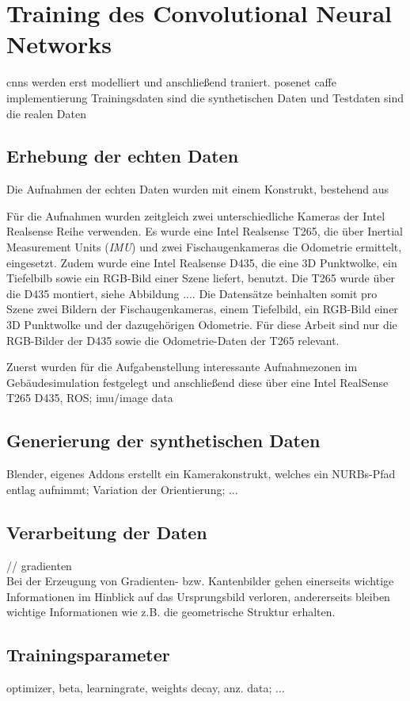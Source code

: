 
\section{Training des Convolutional Neural Networks}
cnns werden erst modelliert und anschließend traniert.
posenet caffe implementierung
Trainingsdaten sind die synthetischen Daten und Testdaten sind die realen Daten

\subsection{Erhebung der echten Daten}

Die Aufnahmen der echten Daten wurden mit einem Konstrukt, bestehend aus 

Für die Aufnahmen wurden zeitgleich zwei unterschiedliche Kameras der Intel Realsense Reihe verwenden. Es wurde eine Intel Realsense T265, die über Inertial Measurement Units (\textit{IMU}) und zwei Fischaugenkameras die Odometrie ermittelt, eingesetzt. Zudem wurde eine Intel Realsense D435, die eine 3D Punktwolke, ein Tiefelbilb sowie ein RGB-Bild einer Szene liefert, benutzt. Die T265 wurde über die D435 montiert, siehe Abbildung .... Die Datensätze beinhalten somit pro Szene zwei Bildern der Fischaugenkameras, einem Tiefelbild, ein RGB-Bild einer 3D Punktwolke und der dazugehörigen Odometrie. Für diese Arbeit sind nur die RGB-Bilder der D435 sowie die Odometrie-Daten der T265 relevant.

Zuerst wurden für die Aufgabenstellung interessante Aufnahmezonen im Gebäudesimulation festgelegt und anschließend diese über eine
Intel RealSense T265 D435, ROS; imu/image data


\subsection{Generierung der synthetischen Daten}
Blender,
eigenes Addons erstellt ein Kamerakonstrukt, welches ein NURBs-Pfad entlag aufnimmt; Variation der Orientierung; ...

\subsection{Verarbeitung der Daten}
// gradienten\\
Bei der Erzeugung von Gradienten- bzw. Kantenbilder gehen einerseits wichtige Informationen im Hinblick auf das Ursprungsbild verloren, andererseits bleiben wichtige Informationen wie z.B. die geometrische Struktur erhalten.

\subsection{Trainingsparameter}
optimizer, beta,
learningrate,
weights decay, anz. data; ...